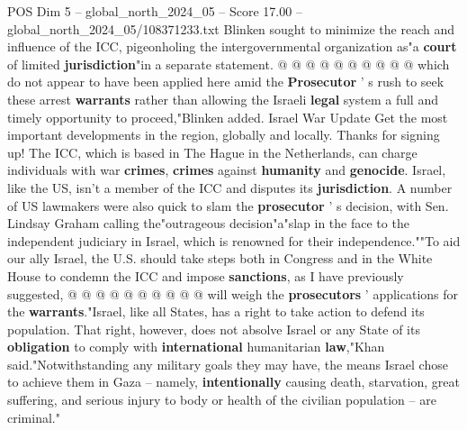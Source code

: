 \begin{textsample}{POS Dim 5 – global\_north\_2024\_05 – Score 17.00 – global\_north\_2024\_05/108371233.txt}
Blinken sought to minimize the reach and influence of the ICC, pigeonholing the intergovernmental organization as"a \textbf{court} of limited \textbf{jurisdiction}"in a separate statement. @ @ @ @ @ @ @ @ @ @ which do not appear to have been applied here amid the \textbf{Prosecutor} ' s rush to seek these arrest \textbf{warrants} rather than allowing the Israeli \textbf{legal} system a full and timely opportunity to proceed,"Blinken added.
Israel War Update Get the most important developments in the region, globally and locally.
Thanks for signing up!
The ICC, which is based in The Hague in the Netherlands, can charge individuals with war \textbf{crimes}, \textbf{crimes} against \textbf{humanity} and \textbf{genocide}.
Israel, like the US, isn't a member of the ICC and disputes its \textbf{jurisdiction}.
A number of US lawmakers were also quick to slam the \textbf{prosecutor} ' s decision, with Sen.
Lindsay Graham calling the"outrageous decision"a"slap in the face to the independent judiciary in Israel, which is renowned for their independence.""To aid our ally Israel, the U.S. should take steps both in Congress and in the White House to condemn the ICC and impose \textbf{sanctions}, as I have previously suggested, @ @ @ @ @ @ @ @ @ @ will weigh the \textbf{prosecutors} ' applications for the \textbf{warrants}."Israel, like all States, has a right to take action to defend its population.
That right, however, does not absolve Israel or any State of its \textbf{obligation} to comply with \textbf{international} humanitarian \textbf{law},"Khan said."Notwithstanding any military goals they may have, the means Israel chose to achieve them in Gaza -- namely, \textbf{intentionally} causing death, starvation, great suffering, and serious injury to body or health of the civilian population -- are criminal."

\end{textsample}
